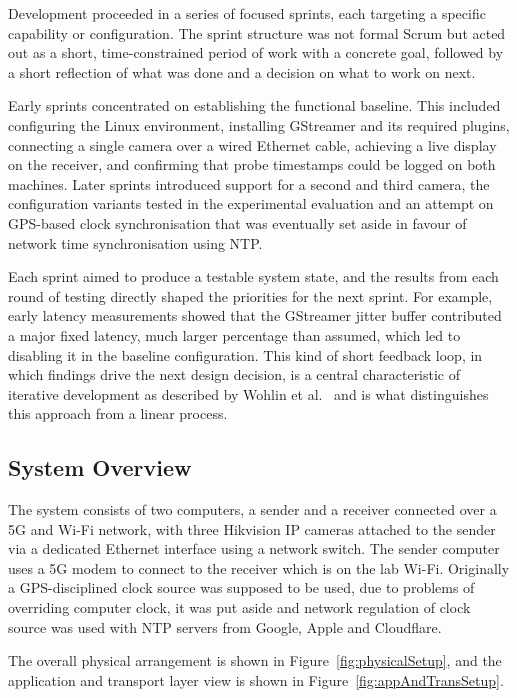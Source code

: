 Development proceeded in a series of focused sprints, each targeting a specific capability or configuration. The sprint structure was not formal Scrum but acted out as a short, time-constrained period of work with a concrete goal, followed by a short reflection of what was done and a decision on what to work on next.

Early sprints concentrated on establishing the functional baseline. This included configuring the Linux environment, installing GStreamer and its required plugins, connecting a single camera over a wired Ethernet cable, achieving a live display on the receiver, and confirming that probe timestamps could be logged on both machines. Later sprints introduced support for a second and third camera, the configuration variants tested in the experimental evaluation and an attempt on GPS-based clock synchronisation that was eventually set aside in favour of network time synchronisation using NTP.

Each sprint aimed to produce a testable system state, and the results from each round of testing directly shaped the priorities for the next sprint. For example, early latency measurements showed that the GStreamer jitter buffer contributed a major fixed latency, much larger percentage than assumed, which led to disabling it in the baseline configuration. This kind of short feedback loop, in which findings drive the next design decision, is a central characteristic of iterative development as described by Wohlin et al.~\cite{wohlin2012} and is what distinguishes this approach from a linear process.
\vspace{5mm}
\subsection{System Overview}

The system consists of two computers, a sender and a receiver connected over a 5G and Wi-Fi network, with three Hikvision IP cameras attached to the sender via a dedicated Ethernet interface using a network switch. The sender computer uses a 5G modem to connect to the receiver which is on the lab Wi-Fi. Originally a GPS-disciplined clock source was supposed to be used, due to problems of overriding computer clock, it was put aside and network regulation of clock source was used with NTP servers from Google, Apple and Cloudflare.

The overall physical arrangement is shown in Figure~\ref{fig:physicalSetup}, and the application and transport layer view is shown in Figure~\ref{fig:appAndTransSetup}.

